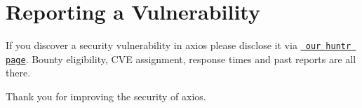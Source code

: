 \chapter{Reporting a Vulnerability}
\hypertarget{md_node__modules_2axios_2_s_e_c_u_r_i_t_y}{}\label{md_node__modules_2axios_2_s_e_c_u_r_i_t_y}
\label{md_node__modules_2axios_2_s_e_c_u_r_i_t_y_autotoc_md178}%
%
 If you discover a security vulnerability in axios please disclose it via \href{https://huntr.dev/repos/axios/axios/}{\texttt{ our huntr page}}. Bounty eligibility, CVE assignment, response times and past reports are all there.

Thank you for improving the security of axios. 